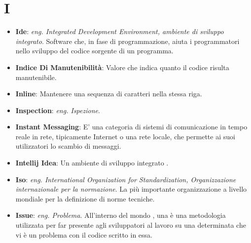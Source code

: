 \section{I}
\begin{itemize}
	\item
	\textbf{Ide}: \textit{eng. Integrated Development Environment, ambiente di sviluppo integrato}. Software che, in fase di programmazione, aiuta i programmatori nello sviluppo del codice sorgente di un programma.
	\item
	\textbf{Indice Di Manutenibilità}: Valore che indica quanto il codice risulta manutenibile.
	\item
	\textbf{Inline}: Mantenere una sequenza di caratteri nella stessa riga.
	\item
	\textbf{Inspection}: \textit{eng. Ispezione}.
	\item
	\textbf{Instant Messaging}: E' una categoria di sistemi di comunicazione in tempo reale in rete, tipicamente Internet o una rete locale, che permette ai suoi utilizzatori lo scambio di messaggi.
	\item
	\textbf{Intellij Idea}: Un ambiente di sviluppo integrato .
	\item
	\textbf{Iso}: \textit{eng. International Organization for Standardization, Organizzazione internazionale per la normazione}. La più importante organizzazione a livello mondiale per la definizione di norme tecniche.
	\item
	\textbf{Issue}: \textit{eng. Problema}. All'interno del mondo , una  è una metodologia utilizzata per far presente agli sviluppatori al lavoro su una determinata  che vi è un problema con il codice scritto in essa.
\end{itemize}
\newpage